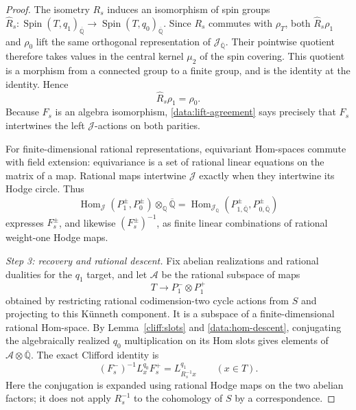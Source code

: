 \begin{proof}
The isometry $R_s$ induces an isomorphism of spin groups
$\widehat R_s:\operatorname{Spin}(T,q_1)_{\overline{\mathbb Q}}
\to\operatorname{Spin}(T,q_0)_{\overline{\mathbb Q}}$.
Since $R_s$ commutes with $\rho_T$, both
$\widehat R_s\rho_1$ and $\rho_0$ lift the same orthogonal
representation of $\mathcal J_{\overline{\mathbb Q}}$.
Their pointwise quotient therefore takes values in the central
kernel $\mu_2$ of the spin covering. This quotient is a morphism
from a connected group to a finite group, and is the identity at
the identity. Hence
\begin{equation}\label{data:lift-agreement}
 \widehat R_s\rho_1=\rho_0.
\end{equation}
Because $F_s$ is an algebra isomorphism,
\eqref{data:lift-agreement} says precisely that $F_s$ intertwines
the left $\mathcal J$-actions on both parities.

For finite-dimensional rational representations, equivariant
Hom-spaces commute with field extension: equivariance is a set
of rational linear equations on the matrix of a map. Rational
maps intertwine $\mathcal J$ exactly when they intertwine its
Hodge circle. Thus
\begin{equation}\label{data:hom-descent}
 \operatorname{Hom}_{\mathcal J}(P_1^\pm,P_0^\pm)
       \otimes_{\mathbb Q}\overline{\mathbb Q}
 =\operatorname{Hom}_{\mathcal J_{\overline{\mathbb Q}}}
       (P_{1,\overline{\mathbb Q}}^\pm,
        P_{0,\overline{\mathbb Q}}^\pm)
\end{equation}
expresses $F_s^\pm$, and likewise $(F_s^\pm)^{-1}$, as finite
linear combinations of rational weight-one Hodge maps.

\smallskip\noindent
\emph{Step 3: recovery and rational descent.}
Fix abelian realizations and rational dualities for the $q_1$
target, and let $\mathcal A$ be the rational subspace of maps
\[
 T\longrightarrow P_1^-\otimes P_1^+
\]
obtained by restricting rational codimension-two cycle actions
from $S$ and projecting to this K\"unneth component. It is a
subspace of a finite-dimensional rational Hom-space.
By Lemma~\ref{cliff:slots} and \eqref{data:hom-descent}, conjugating
the algebraically realized $q_0$ multiplication on its Hom slots
gives elements of $\mathcal A\otimes\overline{\mathbb Q}$.
The exact Clifford identity is
\begin{equation}\label{data:conjugation}
 (F_s^-)^{-1}L_x^{q_0}F_s^+
       =L_{R_s^{-1}x}^{q_1}\qquad(x\in T).
\end{equation}
Here the conjugation is expanded using rational Hodge maps on
the two abelian factors; it does not apply $R_s^{-1}$ to the
cohomology of $S$ by a correspondence.


\end{proof}
